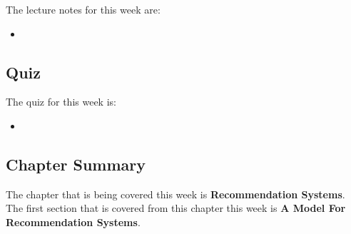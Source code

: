 \noindent The lecture notes for this week are:

\begin{itemize}
    \item {}
\end{itemize}

\subsection{Quiz}

The quiz for this week is:

\begin{itemize}
    \item {}
\end{itemize}

\newpage

\subsection{Chapter Summary}

The chapter that is being covered this week is \textbf{Recommendation Systems}. The first section that is covered from this chapter this week is \textbf{A Model For Recommendation Systems}. 

